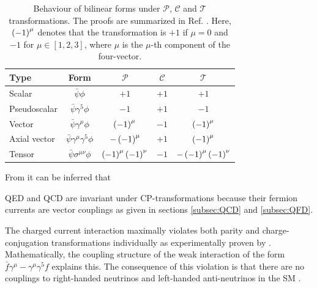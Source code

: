\begin{table}[h]
    \centering
    \caption[Bilinear transformation properties.]{Behaviour of bilinear forms under $\mathcal{P}$, $\mathcal{C}$ and $\mathcal{T}$  transformations. The proofs are summarized in Ref. \cite{Nason11}. Here, $\left( -1 \right)^\mu$ denotes that the transformation is $+1$ if $\mu=0$ and $-1$ for $\mu \in \left[ 1,2,3\right]$, where $\mu$ is the 
     $\mu$-th component of the four-vector.}\label{theory:bilinears}
    \begin{tabular}{lcccc}
        \toprule
        Type         & Form                                 & $\mathcal{P}$               & $\mathcal{C}$ & $\mathcal{T}$                \\ \midrule
        Scalar       & $\bar{\psi}\phi$                     & $+1$                   & $+1$     & $+1$                   \\
        Pseudoscalar & $\bar{\psi}\gamma^5\phi$             & $-1$                   & $+1$     & $-1$                   \\
        Vector       & $\bar{\psi}\gamma^\mu \phi$          & $\left( -1 \right)^{\mu}$    & $-1$     & $\left( -1 \right)^{\mu}$ \\
        Axial vector & $\bar{\psi}\gamma^\mu \gamma^5 \phi$ & $-\left( -1 \right)^{\mu}$     & $+1$     & $\left( -1 \right)^{\mu}$ \\
        Tensor       & $\bar{\psi}\sigma^{\mu\nu} \phi$     & $\left( -1 \right)^{\mu}\left( -1 \right)^{\nu}$   & $-1$     &  $ -\left( -1 \right)^{\mu}\left( -1 \right)^{\nu}$ \\ \bottomrule
    \end{tabular}
\end{table}

From  it can be inferred that 
\begin{ct_version_list}
    \item QED and QCD are invariant under CP-transformations because their fermion currents are vector couplings as given in sections \ref{subsec:QCD} and \ref{subsec:QFD}.
    \item The charged current interaction maximally violates both parity and charge-conjugation transformations individually as experimentally proven by \cite{PhysRev.105.1413}. Mathematically, the coupling structure of the weak interaction of the form $\bar{f}\gamma^\mu-\gamma^\mu \gamma^5 f$ explains this.
            The consequence of this violation is that there are no couplings to right-handed neutrinos and left-handed anti-neutrinos in the SM \cite{PhysRev.109.1015}.
\end{ct_version_list}    

